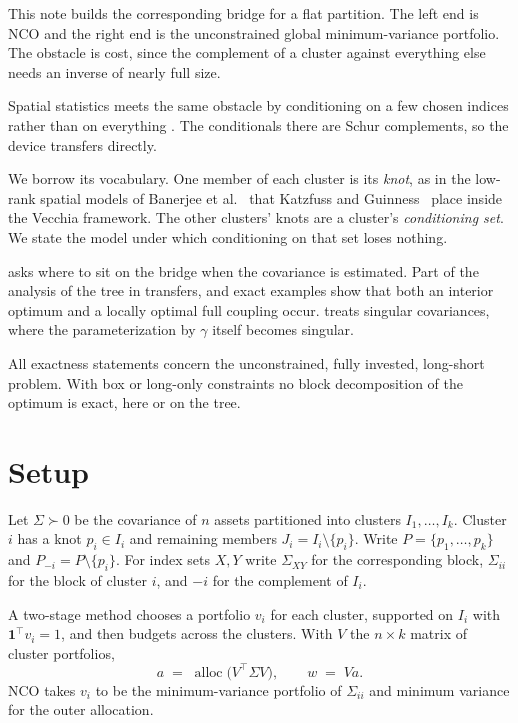 \documentclass[11pt]{article}
\newcommand{\ones}{\mathbf{1}}
\begin{document}
This note builds the corresponding bridge for a flat partition. The left
end is NCO and the right end is the unconstrained global minimum-variance
portfolio. The obstacle is cost, since the complement of a cluster against
everything else needs an inverse of nearly full size.

Spatial statistics meets the same obstacle by conditioning on a few chosen
indices rather than on everything \cite{vecchia1988}. The conditionals
there are Schur complements, so the device transfers directly.

We borrow its vocabulary. One member of each cluster is its \emph{knot}, as
in the low-rank spatial models of Banerjee et al.~\cite{banerjee2008} that
Katzfuss and Guinness~\cite{katzfuss2021} place inside the Vecchia framework. The other
clusters' knots are a cluster's \emph{conditioning set}. We state the model
under which conditioning on that set loses nothing.

 asks where to sit on the bridge when the covariance is
estimated. Part of the analysis of the tree in \cite{cotton2026bridge}
transfers, and exact examples show that both an interior optimum and a
locally optimal full coupling occur.  treats singular
covariances, where the parameterization by $\gamma$ itself becomes
singular.

All exactness statements concern the unconstrained, fully invested,
long-short problem. With box or long-only constraints no block
decomposition of the optimum is exact, here or on the tree.

\section{Setup}

Let $\Sigma\succ0$ be the covariance of $n$ assets partitioned into
clusters $I_1,\dots,I_k$. Cluster $i$ has a knot $p_i\in I_i$ and
remaining members $J_i=I_i\setminus\{p_i\}$. Write $P=\{p_1,\dots,p_k\}$
and $P_{-i}=P\setminus\{p_i\}$. For index sets $X,Y$ write $\Sigma_{XY}$ for the
corresponding block, $\Sigma_{ii}$ for the block of cluster $i$, and $-i$
for the complement of $I_i$.

A two-stage method chooses a portfolio $v_i$ for each cluster, supported on
$I_i$ with $\ones^\top v_i=1$, and then budgets across the clusters. With
$V$ the $n\times k$ matrix of cluster portfolios,
\begin{equation}
  a \;=\; \operatorname{alloc}\!\big(V^\top\Sigma V\big),
  \qquad w \;=\; Va .
  \label{eq:twostage}
\end{equation}
NCO takes $v_i$ to be the minimum-variance portfolio of $\Sigma_{ii}$ and
minimum variance for the outer allocation.
\end{document}
